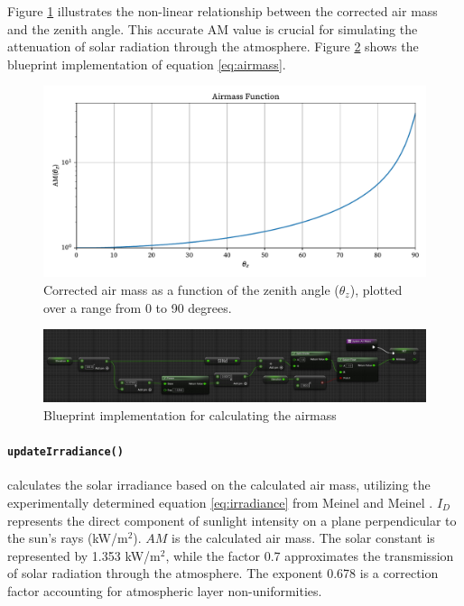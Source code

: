 \documentclass[draft, final]{vutinfth} %
\begin{document}
Figure \ref{fig:corrected-airmass} illustrates the non-linear relationship between the corrected air mass and the zenith angle. This accurate AM value is crucial for simulating the attenuation of solar radiation through the atmosphere. Figure \ref{fig:airmass-bp} shows the blueprint implementation of equation \ref{eq:airmass}.

\begin{figure}[h]
    \centering
    \includegraphics[width=\textwidth]{graphics/airmass.pdf}
    \caption{Corrected air mass as a function of the zenith angle ($\theta_z$), plotted over a range from 0 to 90 degrees.}
    \label{fig:corrected-airmass}
\end{figure}

\begin{figure}
    \centering
    \includegraphics[width=\textwidth]{graphics/airmass-bp.jpg}
    \caption{Blueprint implementation for calculating the airmass}
    \label{fig:airmass-bp}
\end{figure}


\paragraph{\lstinline|updateIrradiance()|} calculates the solar irradiance based on the calculated air mass, utilizing the experimentally determined equation \ref{eq:irradiance} from Meinel and Meinel \cite{Meinel1976irradiance}. $I_D$ represents the direct component of sunlight intensity on a plane perpendicular to the sun's rays (kW/m$^2$). $AM$ is the calculated air mass. The solar constant is represented by 1.353 kW/m$^2$, while the factor 0.7 approximates the transmission of solar radiation through the atmosphere. The exponent 0.678 is a correction factor accounting for atmospheric layer non-uniformities.
\end{document}
